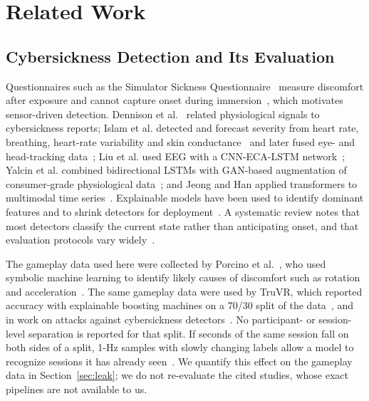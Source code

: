 \section{Related Work}
\label{sec:related}

\subsection{Cybersickness Detection and Its Evaluation}
Questionnaires such as the Simulator Sickness Questionnaire~\cite{kennedy1993ssq} measure discomfort after exposure and cannot capture onset during immersion~\cite{caserman2021cybersickness}, which motivates sensor-driven detection. Dennison et al.~\cite{dennison2016physio} related physiological signals to cybersickness reports; Islam et al. detected and forecast severity from heart rate, breathing, heart-rate variability and skin conductance~\cite{islam2020automatic} and later fused eye- and head-tracking data~\cite{islam2021fusion}; Liu et al. used EEG with a CNN-ECA-LSTM network~\cite{liu2024cnneca}; Yalcin et al. combined bidirectional LSTMs with GAN-based augmentation of consumer-grade physiological data~\cite{yalcin2024automatic}; and Jeong and Han applied transformers to multimodal time series~\cite{jeong2024precyse}. Explainable models have been used to identify dominant features and to shrink detectors for deployment~\cite{kundu2022truvr,kundu2023litevr,kundu2023vrlens}. A systematic review notes that most detectors classify the current state rather than anticipating onset, and that evaluation protocols vary widely~\cite{yang2022mlreview}.

The gameplay data used here were collected by Porcino et al.~\cite{porcino2021methodology,porcino2019uffcsdata}, who used symbolic machine learning to identify likely causes of discomfort such as rotation and acceleration~\cite{porcino2022identifying}. The same gameplay data were used by TruVR, which reported  accuracy with explainable boosting machines on a 70/30 split of the data~\cite{kundu2022truvr}, and in work on attacks against cybersickness detectors~\cite{kundu2025securing}. No participant- or session-level separation is reported for that split. If seconds of the same session fall on both sides of a split, 1-Hz samples with slowly changing labels allow a model to recognize sessions it has already seen~\cite{kapoor2023leakage,kaufman2012leakage,roberts2017cv}. We quantify this effect on the gameplay data in Section~\ref{sec:leak}; we do not re-evaluate the cited studies, whose exact pipelines are not available to us.


